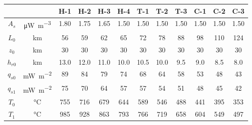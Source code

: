 \begin{tabular}{cccccccccccc}
\toprule
& & H-1 & H-2 & H-3 & H-4 & T-1 & T-2 & T-3 & C-1 & C-2 & C-3 \\
\midrule
$A_{s}$ & \si{\uW\per\m\cubed} & 1.80 & 1.75 & 1.65 & 1.50 & 1.50 & 1.50 & 1.50 & 1.50 & 1.50 & 1.50 \\
$L_{0}$ & \si{\km} & 56 & 59 & 62 & 65 & 72 & 78 & 88 & 98 & 110 & 124 \\
$z_{0}$ & \si{\km} & 30 & 30 & 30 & 30 & 30 & 30 & 30 & 30 & 30 & 30 \\
$h_{r0}$ & \si{\km} & 13.0 & 12.0 & 11.0 & 10.0 & 10.5 & 10.0 & 9.5 & 9.0 & 8.5 & 8.0 \\
\midrule
$q_{s0}$ & \si{\mW\per\m\squared} & 89 & 84 & 79 & 74 & 68 & 64 & 58 & 53 & 48 & 43 \\
$q_{s1}$ & \si{\mW\per\m\squared} & 75 & 70 & 64 & 57 & 57 & 54 & 51 & 48 & 45 & 42 \\
$T_{0}$ & \si{\degreeCelsius} & 755 & 716 & 679 & 644 & 589 & 546 & 488 & 441 & 395 & 353 \\
$T_{1}$ & \si{\degreeCelsius} & 985 & 928 & 863 & 793 & 766 & 719 & 658 & 604 & 549 & 497 \\
\bottomrule
\end{tabular}
